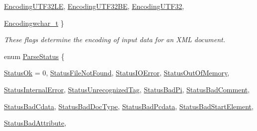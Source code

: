 \begin{DoxyCompactItemize}
\hyperlink{namespacephys_1_1xml_a420f5de782438f88160321385bea2015a127752883aaf8c9bdb5f66ec725211fc}{EncodingUTF32LE}, 
\hyperlink{namespacephys_1_1xml_a420f5de782438f88160321385bea2015a5fb13deaf1552b0f4c00e2b8cafce0b9}{EncodingUTF32BE}, 
\hyperlink{namespacephys_1_1xml_a420f5de782438f88160321385bea2015ac61c2f632bd66c2466c29783beb33f8a}{EncodingUTF32}, 
\par
\hyperlink{namespacephys_1_1xml_a420f5de782438f88160321385bea2015a2bc9c8d42796901c8feaa25e17c56cef}{Encodingwchar\_\-t}
 \}
\begin{DoxyCompactList}\small\item\em These flags determine the encoding of input data for an XML document. \item\end{DoxyCompactList}\item 
enum \hyperlink{namespacephys_1_1xml_ae7aabb879b21c73d8183a54470f8917f}{ParseStatus} \{ \par
\hyperlink{namespacephys_1_1xml_ae7aabb879b21c73d8183a54470f8917fa9ea9b3eecb4bb9f01745c94150982560}{StatusOk} =  0, 
\hyperlink{namespacephys_1_1xml_ae7aabb879b21c73d8183a54470f8917fa6f0279c8ce0103b77edcf3ce91fa64b4}{StatusFileNotFound}, 
\hyperlink{namespacephys_1_1xml_ae7aabb879b21c73d8183a54470f8917fa63f6d040311f50c1234a8eb873a0a95c}{StatusIOError}, 
\hyperlink{namespacephys_1_1xml_ae7aabb879b21c73d8183a54470f8917fac2a8163c9a8e285153d2a96b011bd49f}{StatusOutOfMemory}, 
\par
\hyperlink{namespacephys_1_1xml_ae7aabb879b21c73d8183a54470f8917fa458daab0a01f8dd3d0d85b4e41b9e187}{StatusInternalError}, 
\hyperlink{namespacephys_1_1xml_ae7aabb879b21c73d8183a54470f8917fabe0f4590debfa56c7e3a4c8da261b106}{StatusUnrecognizedTag}, 
\hyperlink{namespacephys_1_1xml_ae7aabb879b21c73d8183a54470f8917fa55afc9de133574f5c9376493c8e6fe09}{StatusBadPi}, 
\hyperlink{namespacephys_1_1xml_ae7aabb879b21c73d8183a54470f8917fa8f3864efd7b684ae57a8a7886a23f19a}{StatusBadComment}, 
\par
\hyperlink{namespacephys_1_1xml_ae7aabb879b21c73d8183a54470f8917fa18f36b8d712a6bbc716f90af8659df22}{StatusBadCdata}, 
\hyperlink{namespacephys_1_1xml_ae7aabb879b21c73d8183a54470f8917fa8fb41bcdb73615156e9a031fa4c5db4f}{StatusBadDocType}, 
\hyperlink{namespacephys_1_1xml_ae7aabb879b21c73d8183a54470f8917fab30b3a432145b0e9c6595e75da773628}{StatusBadPcdata}, 
\hyperlink{namespacephys_1_1xml_ae7aabb879b21c73d8183a54470f8917fadbc5b334b4215ce2332073de46c58155}{StatusBadStartElement}, 
\par
\hyperlink{namespacephys_1_1xml_ae7aabb879b21c73d8183a54470f8917fac5fdddc5cc4d127aa5c53efb85846ccf}{StatusBadAttribute}, 

\end{DoxyCompactItemize}
